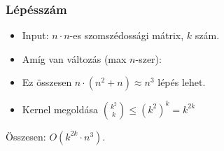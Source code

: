 \begin{frame}
\frametitle{Lépésszám}
\begin{footnotesize}
\begin{itemize}
\item Input: $n\cdot{}n$-es szomszédossági mátrix, $k$ szám.
\item Amíg van változás (max $n$-szer):
\begin{itemize}
\end{itemize}
\item Ez összesen $n\cdot{}(n^2+n) \approx n^3$ lépés lehet.
\item Kernel megoldása ${{k^2}\choose{k}} \leq{} (k^2)^{k} = k^{2k}$
\end{itemize}
\end{footnotesize}
Összesen: $O(k^{2k}\cdot{}n^3)$.
\end{frame}
